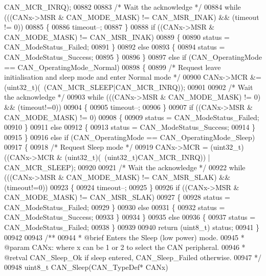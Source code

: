 \begin{DoxyCode}
      CAN_MCR_INRQ);
00882 
00883     \textcolor{comment}{/* Wait the acknowledge */}
00884     \textcolor{keywordflow}{while} (((CANx->MSR & CAN_MODE_MASK) != CAN_MSR_INAK) && (timeout != 0))
00885     \{
00886       timeout--;
00887     \}
00888     \textcolor{keywordflow}{if} ((CANx->MSR & CAN_MODE_MASK) != CAN_MSR_INAK)
00889     \{
00890       status = CAN_ModeStatus_Failed;
00891     \}
00892     \textcolor{keywordflow}{else}
00893     \{
00894       status = CAN_ModeStatus_Success;
00895     \}
00896   \}
00897   \textcolor{keywordflow}{else}  \textcolor{keywordflow}{if} (CAN\_OperatingMode == CAN_OperatingMode_Normal)
00898   \{
00899     \textcolor{comment}{/* Request leave initialisation and sleep mode  and enter Normal mode */}
00900     CANx->MCR &= (uint32\_t)(~(CAN_MCR_SLEEP|CAN_MCR_INRQ));
00901 
00902     \textcolor{comment}{/* Wait the acknowledge */}
00903     \textcolor{keywordflow}{while} (((CANx->MSR & CAN_MODE_MASK) != 0) && (timeout!=0))
00904     \{
00905       timeout--;
00906     \}
00907     \textcolor{keywordflow}{if} ((CANx->MSR & CAN_MODE_MASK) != 0)
00908     \{
00909       status = CAN_ModeStatus_Failed;
00910     \}
00911     \textcolor{keywordflow}{else}
00912     \{
00913       status = CAN_ModeStatus_Success;
00914     \}
00915   \}
00916   \textcolor{keywordflow}{else}  \textcolor{keywordflow}{if} (CAN\_OperatingMode == CAN_OperatingMode_Sleep)
00917   \{
00918     \textcolor{comment}{/* Request Sleep mode */}
00919     CANx->MCR = (uint32\_t)((CANx->MCR & (uint32\_t)(~(uint32\_t)CAN_MCR_INRQ)) | 
      CAN_MCR_SLEEP);
00920 
00921     \textcolor{comment}{/* Wait the acknowledge */}
00922     \textcolor{keywordflow}{while} (((CANx->MSR & CAN_MODE_MASK) != CAN_MSR_SLAK) && (timeout!=0))
00923     \{
00924       timeout--;
00925     \}
00926     \textcolor{keywordflow}{if} ((CANx->MSR & CAN_MODE_MASK) != CAN_MSR_SLAK)
00927     \{
00928       status = CAN_ModeStatus_Failed;
00929     \}
00930     \textcolor{keywordflow}{else}
00931     \{
00932       status = CAN_ModeStatus_Success;
00933     \}
00934   \}
00935   \textcolor{keywordflow}{else}
00936   \{
00937     status = CAN_ModeStatus_Failed;
00938   \}
00939 
00940   \textcolor{keywordflow}{return}  (uint8\_t) status;
00941 \}
00942 
00943 \textcolor{comment}{/**}
00944 \textcolor{comment}{  * @brief  Enters the Sleep (low power) mode.}
00945 \textcolor{comment}{  * @param  CANx: where x can be 1 or 2 to select the CAN peripheral.}
00946 \textcolor{comment}{  * @retval CAN\_Sleep\_Ok if sleep entered, CAN\_Sleep\_Failed otherwise.}
00947 \textcolor{comment}{  */}
00948 uint8\_t CAN_Sleep(CAN\_TypeDef* CANx)

\end{DoxyCode}

